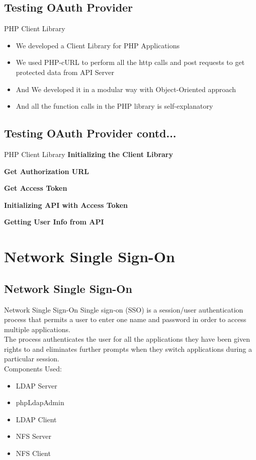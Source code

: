 \documentclass[10pt,xcolor=dvipsnames]{beamer}
\begin{document}
\subsection{Testing OAuth Provider}
\begin{frame}{PHP Client Library}
\begin{itemize}
	\item We developed a Client Library for PHP Applications
	\item We used PHP-cURL to perform all the http calls and post requests to get protected data from API Server
	\item And We developed it in a modular way with Object-Oriented approach
	\item And all the function calls in the PHP library is self-explanatory
\end{itemize}
\end{frame}

\subsection{Testing OAuth Provider contd...}
\begin{frame}{PHP Client Library}
\textbf{Initializing the Client Library}

\textbf{Get Authorization URL}

\textbf{Get Access Token}

\textbf{Initializing API with Access Token}

\textbf{Getting User Info from API}

\end{frame}
\section{Network Single Sign-On}
\subsection{Network Single Sign-On}
\begin{frame}{Network Single Sign-On}
	Single sign-on (SSO) is a session/user authentication process that permits a user to enter one name and password in order to access multiple applications.\\
	The process authenticates the user for all the applications they have been given rights to and eliminates further prompts when they switch applications during a particular session.\\
	Components Used:
	\begin{itemize}
	\item LDAP Server
	\item phpLdapAdmin
	\item LDAP Client
	\item NFS Server
	\item NFS Client
	\end{itemize}
	
\end{frame}
\end{document}

